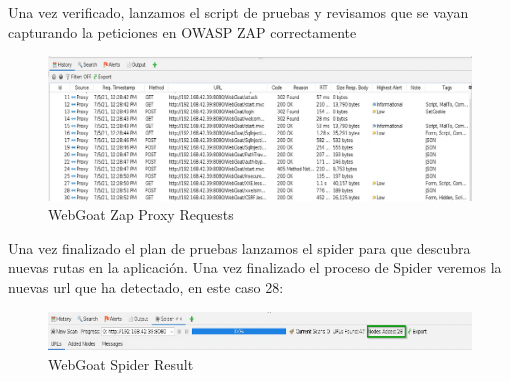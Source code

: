 \newpage

Una vez verificado, lanzamos el script de pruebas y revisamos que se vayan capturando la peticiones en OWASP ZAP correctamente

\begin{figure}[!htb]
    \captionsetup{width=1\linewidth}  
    \includegraphics[width=\linewidth]{./imagenes/04_1_1_02_WebGoat_ZapProxyRQST.png}
    \caption{WebGoat Zap Proxy Requests}  
    \label{fig:WebGoat Zap Proxy Requests}
\end{figure}

Una vez finalizado el plan de pruebas lanzamos el spider para que descubra nuevas rutas en la aplicación. Una vez finalizado 
el proceso de Spider veremos la nuevas url que ha detectado, en este caso 28:\\

\begin{figure}[!htb]
    \captionsetup{width=1\linewidth}  
    \includegraphics[width=\linewidth]{./imagenes/04_1_1_03_WebGoat_ZapProxySpiderResult.png}
    \caption{WebGoat Spider Result}  
    \label{fig:WebGoat Spider Result}
\end{figure}

